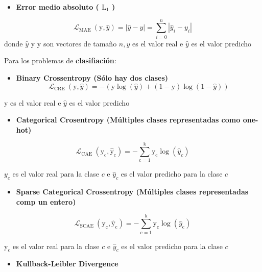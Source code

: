 \documentclass[
  a4paper,
  DIV=11,
  numbers=noendperiod]{scrreprt}
\providecommand{\tightlist}{%
  \setlength{\itemsep}{0pt}\setlength{\parskip}{0pt}}\usepackage{longtable,booktabs,array}
\begin{document}
\begin{itemize}
\tightlist
\item
  \textbf{Error medio absoluto ( \(\mathrm{L}_1\) )}
\end{itemize}

\[
\mathcal{L}_{\text {MAE }}(\mathrm{y}, \hat{y})=|\hat{y}-y|=\sum_{i=0}^n\left|\hat{y}_i-y_i\right|
\] donde \(\hat{y}\) y y son vectores de tamaño \(n, y\) es el valor
real e \(\hat{y}\) es el valor predicho

Para los problemas de \textbf{clasifiación}:

\begin{itemize}
\tightlist
\item
  \textbf{Binary Crossentropy (Sólo hay dos clases)} \[
  \mathcal{L}_{\text {CRE }}(\mathrm{y}, \hat{y})=-(\mathrm{y} \log (\hat{y})+(1-\mathrm{y}) \log (1-\hat{y}))
  \]
\end{itemize}

\(\mathrm{y}\) es el valor real e \(\hat{y}\) es el valor predicho

\begin{itemize}
\tightlist
\item
  \textbf{Categorical Crosentropy (Múltiples clases representadas como
  one-hot)}
\end{itemize}

\[
\mathcal{L}_{\text {CAE }}\left(\mathrm{y}_{\mathrm{c}}, \hat{\mathrm{y}}_{\mathrm{c}}\right)=-\sum_{\mathrm{c}=1}^{\mathrm{k}} \mathrm{y}_{\mathrm{c}} \log \left(\hat{y}_c\right)
\]

\(y_c\) es el valor real para la clase \(c\) e \(\hat{y}_c\) es el valor
predicho para la clase \(c\)

\begin{itemize}
\tightlist
\item
  \textbf{Sparse Categorical Crossentropy (Múltiples clases
  representadas comp un entero)}
\end{itemize}

\[
\mathcal{L}_{\text {SCAE }}\left(\mathrm{y}_{\mathrm{c}}, \hat{\mathrm{y}}_{\mathrm{c}}\right)=-\sum_{\mathrm{c}=1}^{\mathrm{k}} \mathrm{y}_{\mathrm{c}} \log \left(\hat{y}_{\mathrm{c}}\right)
\]

\(\mathrm{y}_c\) es el valor real para la clase \(c\) e \(\hat{y}_c\) es
el valor predicho para la clase \(c\)

\begin{itemize}
\tightlist
\item
  \textbf{Kullback-Leibler Divergence}
\end{itemize}
\end{document}
